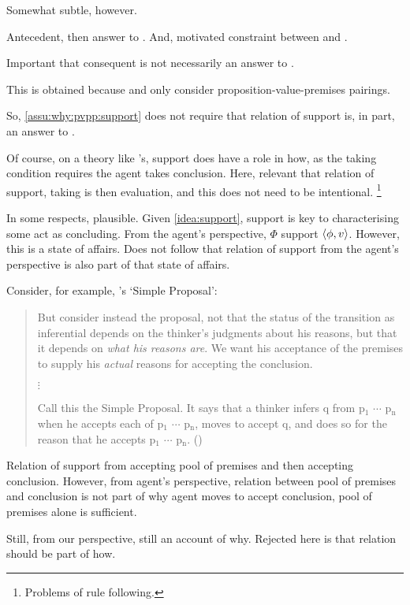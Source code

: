 \begin{note}
  Somewhat subtle, however.

  Antecedent, then answer to \qWhy{}.
  And, motivated constraint between \qWhy{} and \qHow{}.

  Important that consequent is not necessarily an answer to \qHow{}.

  This is obtained because \qWhy{} and \qHow{} only consider proposition-value-premises pairings.

  So, \autoref{assu:why:pvpp:support} does not require that relation of support is, in part, an answer to \qHow{}.

  Of course, on a theory like \citeauthor{Boghossian:2014aa}'s, support does have a role in how, as the taking condition requires the agent takes conclusion.
  Here, relevant that relation of support, taking is then evaluation, and this does not need to be intentional.%
  \footnote{
    Problems of rule following.
  }

  In some respects, plausible.
  Given \autoref{idea:support}, support is key to characterising some act as concluding.
  From the agent's perspective, \(\Phi\) support \(\langle \phi, v \rangle\).
  However, this is a state of affairs.
  Does not follow that relation of support from the agent's perspective is also part of that state of affairs.

  Consider, for example, \citeauthor{Wright:2014tt}'s `Simple Proposal':
  \begin{quote}
    But consider instead the proposal, not that the status of the transition as inferential depends on the thinker's judgments about his reasons, but that it depends on \emph{what his reasons are}.
    We want his acceptance of the premises to supply his \emph{actual} reasons for accepting the conclusion.

    \mbox{}\hfill\(\vdots\)\hfill\mbox{}

    Call this the Simple Proposal.
    It says that a thinker infers q from p\(_{1}\) \(\cdots\) p\(_{\text{n}}\) when he accepts each of p\(_{1}\) \(\cdots\) p\(_{\text{n}}\), moves to accept q, and does so for the reason that he accepts p\(_{1}\) \(\cdots\) p\(_{\text{n}}\).\newline
    \mbox{}\hfill\mbox{(\citeyear[33]{Wright:2014tt})}
  \end{quote}

  Relation of support from accepting pool of premises and then accepting conclusion.
  However, from agent's perspective, relation between pool of premises and conclusion is not part of why agent moves to accept conclusion, pool of premises alone is sufficient.

  Still, from our perspective, still an account of why.
  Rejected here is that relation should be part of how.
\end{note}

